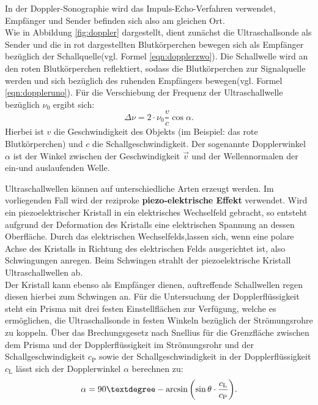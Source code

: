 In der Doppler-Sonographie wird das Impuls-Echo-Verfahren verwendet, Empfänger und Sender befinden sich also am gleichen Ort.\\
Wie in Abbildung \ref{fig:doppler} dargestellt, dient zunächst die Ultraschallsonde als Sender und die in rot dargestellten Blutkörperchen bewegen sich als Empfänger bezüglich der Schallquelle(vgl. Formel \eqref{eqn:dopplerzwo}). Die Schallwelle wird an den roten Blutkörperchen reflektiert, sodass die Blutkörperchen zur Signalquelle werden und sich bezüglich des ruhenden Empfängers bewegen(vgl. Formel \eqref{eqn:doppleruno}).
Für die Verschiebung der Frequenz der Ultraschallwelle bezüglich $\nu_0$ ergibt sich:
\begin{equation}
  \label{eqn:verschiebung}
  \Delta \nu=2\cdot\nu_0\frac{v}{c}\cos{\alpha} \text{.}
\end{equation}
Hierbei ist $v$ die Geschwindigkeit des Objekts (im Beispiel: das rote Blutkörperchen) und $c$ die Schallgeschwindigkeit.
Der sogenannte Dopplerwinkel $\alpha$ ist der Winkel zwischen der Geschwindigkeit $\vec{v}$ und der Wellennormalen der ein-und auslaufenden Welle.

Ultraschallwellen können auf unterschiedliche Arten erzeugt werden. Im vorliegenden Fall wird der reziproke \textbf{piezo-elektrische Effekt} verwendet.
Wird ein piezoelektrischer Kristall in ein elektrisches Wechselfeld gebracht, so entsteht aufgrund der Deformation des Kristalls eine elektrischen Spannung an dessen Oberfläche. Durch das elektrischen Wechselfelds,lassen sich, wenn eine polare Achse des Kristalls in Richtung des elektrischen Felds ausgerichtet ist, also Schwingungen anregen.
Beim Schwingen strahlt der piezoelektrische Kristall Ultraschallwellen ab.\\
Der Kristall kann ebenso als Empfänger dienen, auftreffende Schallwellen regen diesen hierbei zum Schwingen an.
Für die Untersuchung der Dopplerflüssigkeit steht ein Prisma mit drei festen Einstellflächen zur Verfügung, welche es ermöglichen, die Ultraschallsonde in festen Winkeln bezüglich der Strömungsrohre zu koppeln.
Über das Brechungsgesetz nach Snellius für die Grenzfläche zwischen dem Prisma und der Dopplerflüssigkeit im Strömungsrohr und der Schallgeschwindigkeit $c_\mathrm{P}$ sowie der Schallgeschwindigkeit in der Dopplerflüssigkeit $c_\mathrm{L}$ lässt sich der Dopplerwinkel $\alpha$ berechnen zu:
\begin{equation}
  \label{eqn:dopplerwinkel}
  \alpha=90\textdegree-\arcsin{\left(\sin{\theta}\cdot\frac{c_\mathrm{L}}{c_\mathrm{P}}\right)}\text{.}
\end{equation}
